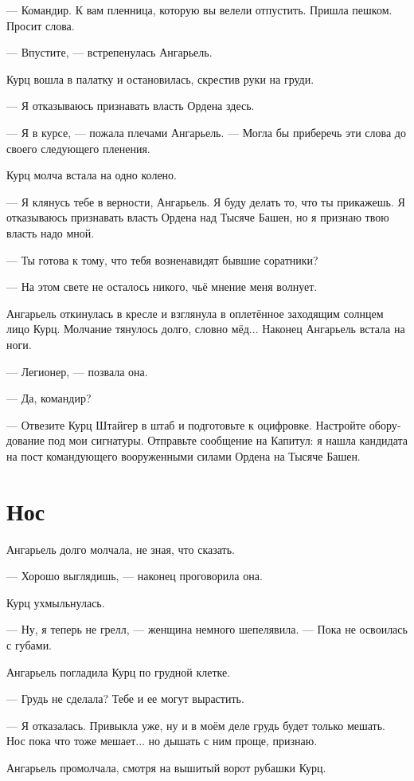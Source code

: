 \documentclass[a4paper,12pt,fleqn]{book}\usepackage{polyglossia}\setdefaultlanguage[babelshorthands=true]{russian}\setotherlanguage{english}\defaultfontfeatures{Ligatures=TeX,Mapping=tex-text}\usepackage{xcolor}\newcommand{\ml}[3]{#2}
\begin{document}
--- Командир.
К вам пленница, которую вы велели отпустить.
Пришла пешком.
Просит слова.

--- Впустите, --- встрепенулась Ангарьель.

Курц вошла в палатку и остановилась, скрестив руки на груди.

--- Я отказываюсь признавать власть Ордена здесь.

--- Я в курсе, --- пожала плечами Ангарьель.
--- Могла бы приберечь эти слова до своего следующего пленения.

Курц молча встала на одно колено.

--- Я клянусь тебе в верности, Ангарьель.
Я буду делать то, что ты прикажешь.
Я отказываюсь признавать власть Ордена над Тысяче Башен, но я признаю твою власть надо мной.

--- Ты готова к тому, что тебя возненавидят бывшие соратники?

--- На этом свете не осталось никого, чьё мнение меня волнует.

Ангарьель откинулась в кресле и взглянула в оплетённое заходящим солнцем лицо Курц.
Молчание тянулось долго, словно мёд...
Наконец Ангарьель встала на ноги.

--- Легионер, --- позвала она.

--- Да, командир?

--- Отвезите Курц Штайгер в штаб и подготовьте к оцифровке.
Настройте оборудование под мои сигнатуры.
Отправьте сообщение на Капитул: я нашла кандидата на пост командующего вооруженными силами Ордена на Тысяче Башен.

\section{Нос}

Ангарьель долго молчала, не зная, что сказать.

--- Хорошо выглядишь, --- наконец проговорила она.

Курц ухмыльнулась.

--- Ну, я теперь не грелл, --- женщина немного шепелявила.
--- Пока не освоилась с губами.

Ангарьель погладила Курц по грудной клетке.

--- Грудь не сделала?
Тебе и ее могут вырастить.

--- Я отказалась.
Привыкла уже, ну и в моём деле грудь будет только мешать.
Нос пока что тоже мешает... но дышать с ним проще, признаю.

Ангарьель промолчала, смотря на вышитый ворот рубашки Курц.
\end{document}
